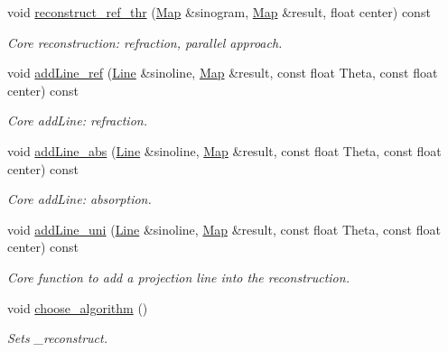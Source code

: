 \begin{DoxyCompactItemize}
void \hyperlink{classCTrec_a779c44d7e4d066af17182d18648f58bd}{reconstruct\_\-ref\_\-thr} (\hyperlink{group__Types_ga8747378c016fc11d9ecbb98787248c25}{Map} \&sinogram, \hyperlink{group__Types_ga8747378c016fc11d9ecbb98787248c25}{Map} \&result, float center) const 
\begin{DoxyCompactList}\small\item\em Core reconstruction: refraction, parallel approach. \item\end{DoxyCompactList}\item 
void \hyperlink{classCTrec_ac016e9ad52824ecd69bc4ebbba688282}{addLine\_\-ref} (\hyperlink{group__Types_ga4ce3fdeba27702c8b09a141e22709e38}{Line} \&sinoline, \hyperlink{group__Types_ga8747378c016fc11d9ecbb98787248c25}{Map} \&result, const float Theta, const float center) const 
\begin{DoxyCompactList}\small\item\em Core addLine: refraction. \item\end{DoxyCompactList}\item 
void \hyperlink{classCTrec_a5e986b37c54a91ee417bb3081bf0cdd3}{addLine\_\-abs} (\hyperlink{group__Types_ga4ce3fdeba27702c8b09a141e22709e38}{Line} \&sinoline, \hyperlink{group__Types_ga8747378c016fc11d9ecbb98787248c25}{Map} \&result, const float Theta, const float center) const 
\begin{DoxyCompactList}\small\item\em Core addLine: absorption. \item\end{DoxyCompactList}\item 
void \hyperlink{classCTrec_ae5cdc2190ad4d7c2da723f95d1a26529}{addLine\_\-uni} (\hyperlink{group__Types_ga4ce3fdeba27702c8b09a141e22709e38}{Line} \&sinoline, \hyperlink{group__Types_ga8747378c016fc11d9ecbb98787248c25}{Map} \&result, const float Theta, const float center) const 
\begin{DoxyCompactList}\small\item\em Core function to add a projection line into the reconstruction. \item\end{DoxyCompactList}\item 
void \hyperlink{classCTrec_a201dd58d6ae65a55ec1fd9f5300f7064}{choose\_\-algorithm} ()
\begin{DoxyCompactList}\small\item\em Sets \_\-reconstruct. \item\end{DoxyCompactList}\end{DoxyCompactItemize}
